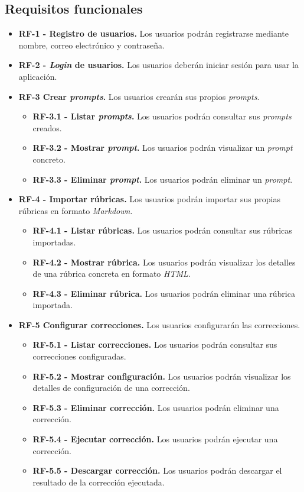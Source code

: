 \subsection{Requisitos funcionales}
\begin{itemize}
    \item \textbf{RF-1 - Registro de usuarios.} Los usuarios podrán registrarse mediante nombre, correo electrónico y contraseña.
    \item \textbf{RF-2 - \textit{Login} de usuarios.} Los usuarios deberán iniciar sesión para usar la aplicación.
    \item \textbf{RF-3 Crear \textit{prompts}.} Los usuarios crearán sus propios \textit{prompts}.
    \begin{itemize}
        \item \textbf{RF-3.1 - Listar \textit{prompts}.} Los usuarios podrán consultar sus \textit{prompts} creados.
        \item \textbf{RF-3.2 - Mostrar \textit{prompt}.} Los usuarios podrán visualizar un \textit{prompt} concreto.
        \item \textbf{RF-3.3 - Eliminar \textit{prompt}.} Los usuarios podrán eliminar un \textit{prompt}.
    \end{itemize}
    \item \textbf{RF-4 - Importar rúbricas.} Los usuarios podrán importar sus propias rúbricas en formato \textit{Markdown}.
    \begin{itemize}
        \item \textbf{RF-4.1 - Listar rúbricas.} Los usuarios podrán consultar sus rúbricas importadas.
        \item \textbf{RF-4.2 - Mostrar rúbrica.} Los usuarios podrán visualizar los detalles de una rúbrica concreta en formato \textit{HTML}.
        \item \textbf{RF-4.3 - Eliminar rúbrica.} Los usuarios podrán eliminar una rúbrica importada.
    \end{itemize}
    \item \textbf{RF-5 Configurar correcciones.} Los usuarios configurarán las correcciones.
    \begin{itemize}
        \item \textbf{RF-5.1 - Listar correcciones.} Los usuarios podrán consultar sus correcciones configuradas.
        \item \textbf{RF-5.2 - Mostrar configuración.} Los usuarios podrán visualizar los detalles de configuración de una corrección.
        \item \textbf{RF-5.3 - Eliminar corrección.} Los usuarios podrán eliminar una corrección.
        \item \textbf{RF-5.4 - Ejecutar corrección.} Los usuarios podrán ejecutar una corrección.
        \item \textbf{RF-5.5 - Descargar corrección.} Los usuarios podrán descargar el resultado de la corrección ejecutada.
    \end{itemize}

\end{itemize}

